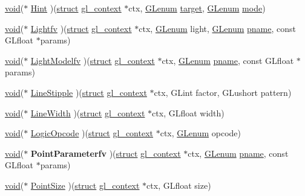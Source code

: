 \begin{Indent}
\begin{DoxyCompactItemize}
\item 
\hyperlink{interfacevoid}{void}($\ast$ \hyperlink{structdd__function__table_a3a33772ef04628691bd808904b1c1c0d}{Hint} )(\hyperlink{interfacestruct}{struct} \hyperlink{structgl__context}{gl\+\_\+context} $\ast$ctx, \hyperlink{interfacevoid}{G\+Lenum} \hyperlink{interfacevoid}{target}, \hyperlink{interfacevoid}{G\+Lenum} \hyperlink{interfacevoid}{mode})
\item 
\hyperlink{interfacevoid}{void}($\ast$ \hyperlink{structdd__function__table_a43b63d95c85f068186d818b1d8cb2b51}{Lightfv} )(\hyperlink{interfacestruct}{struct} \hyperlink{structgl__context}{gl\+\_\+context} $\ast$ctx, \hyperlink{interfacevoid}{G\+Lenum} light, \hyperlink{interfacevoid}{G\+Lenum} \hyperlink{interfacevoid}{pname}, const G\+Lfloat $\ast$params)
\item 
\hyperlink{interfacevoid}{void}($\ast$ \hyperlink{structdd__function__table_a1b835dd88a3a64aeb91f3bb8d318874a}{Light\+Modelfv} )(\hyperlink{interfacestruct}{struct} \hyperlink{structgl__context}{gl\+\_\+context} $\ast$ctx, \hyperlink{interfacevoid}{G\+Lenum} \hyperlink{interfacevoid}{pname}, const G\+Lfloat $\ast$params)
\item 
\hyperlink{interfacevoid}{void}($\ast$ \hyperlink{structdd__function__table_ac12a98543e785ceb983f4d38e8d9a089}{Line\+Stipple} )(\hyperlink{interfacestruct}{struct} \hyperlink{structgl__context}{gl\+\_\+context} $\ast$ctx, G\+Lint factor, G\+Lushort pattern)
\item 
\hyperlink{interfacevoid}{void}($\ast$ \hyperlink{structdd__function__table_aeed6f87badf8228355b8c08bb0199dca}{Line\+Width} )(\hyperlink{interfacestruct}{struct} \hyperlink{structgl__context}{gl\+\_\+context} $\ast$ctx, G\+Lfloat width)
\item 
\hyperlink{interfacevoid}{void}($\ast$ \hyperlink{structdd__function__table_a0a18048817ee65f99d555958cd79c83d}{Logic\+Opcode} )(\hyperlink{interfacestruct}{struct} \hyperlink{structgl__context}{gl\+\_\+context} $\ast$ctx, \hyperlink{interfacevoid}{G\+Lenum} opcode)
\item 
\mbox{\label{structdd__function__table_adf38ae3520dbb171b516b08c27eb05c3}} 
\hyperlink{interfacevoid}{void}($\ast$ {\bfseries Point\+Parameterfv} )(\hyperlink{interfacestruct}{struct} \hyperlink{structgl__context}{gl\+\_\+context} $\ast$ctx, \hyperlink{interfacevoid}{G\+Lenum} \hyperlink{interfacevoid}{pname}, const G\+Lfloat $\ast$params)
\item 
\hyperlink{interfacevoid}{void}($\ast$ \hyperlink{structdd__function__table_a57de2bc01cf4df1c5f7f7457083eacf1}{Point\+Size} )(\hyperlink{interfacestruct}{struct} \hyperlink{structgl__context}{gl\+\_\+context} $\ast$ctx, G\+Lfloat size)

\end{DoxyCompactItemize}
\end{Indent}
